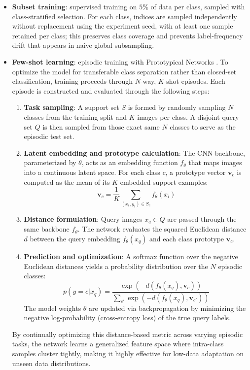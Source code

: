\documentclass[cameraready]{Interspeech}
\begin{document}
\begin{itemize}
    \item \textbf{Subset training}: supervised training on $5\%$ of data per class, sampled with class-stratified selection. For each class, indices are sampled independently without replacement using the experiment seed, with at least one sample retained per class; this preserves class coverage and prevents label-frequency drift that appears in naive global subsampling.
    \item \textbf{Few-shot learning}: episodic training with Prototypical Networks \cite{NIPS2017_cb8da676}. To optimize the model for transferable class separation rather than closed-set classification, training proceeds through $N$-way, $K$-shot episodes. Each episode is constructed and evaluated through the following steps:
    \begin{enumerate}
        \item \textbf{Task sampling}: A support set $S$ is formed by randomly sampling $N$ classes from the training split and $K$ images per class. A disjoint query set $Q$ is then sampled from those exact same $N$ classes to serve as the episodic test set.
        \item \textbf{Latent embedding and prototype calculation}: The CNN backbone, parameterized by $\theta$, acts as an embedding function $f_\theta$ that maps images into a continuous latent space. For each class $c$, a prototype vector $\mathbf{v}_c$ is computed as the mean of its $K$ embedded support examples:
        $$ \mathbf{v}_c = \frac{1}{K} \sum_{(x_i, y_i) \in S_c} f_\theta(x_i) $$
        \item \textbf{Distance formulation}: Query images $x_q \in Q$ are passed through the same backbone $f_\theta$. The network evaluates the squared Euclidean distance $d$ between the query embedding $f_\theta(x_q)$ and each class prototype $\mathbf{v}_c$.
        \item \textbf{Prediction and optimization}: A softmax function over the negative Euclidean distances yields a probability distribution over the $N$ episodic classes:
        $$ p(y=c|x_q) = \frac{\exp(-d(f_\theta(x_q), \mathbf{v}_c))}{\sum_{c'} \exp(-d(f_\theta(x_q), \mathbf{v}_{c'}))} $$
        The model weights $\theta$ are updated via backpropagation by minimizing the negative log-probability (cross-entropy loss) of the true query labels.
    \end{enumerate}
    By continually optimizing this distance-based metric across varying episodic tasks, the network learns a generalized feature space where intra-class samples cluster tightly, making it highly effective for low-data adaptation on unseen data distributions.
\end{itemize}
\end{document}
